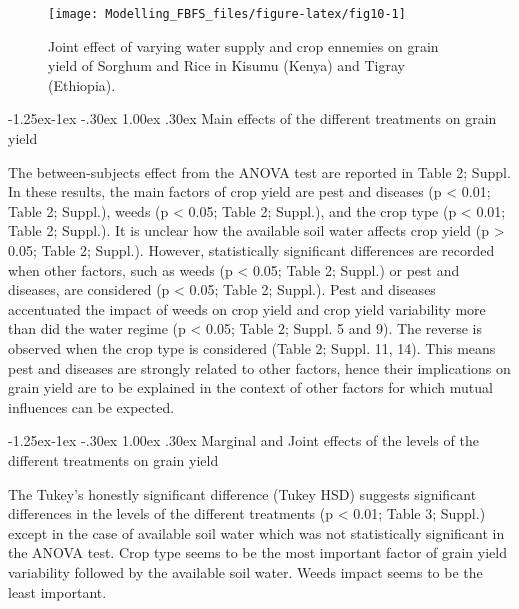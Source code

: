 \documentclass[12pt,oneside]{article}
\makeatletter
\renewcommand\subparagraph{\@startsection{subparagraph}{5}{\z@}%
            {-1.25ex\@plus -1ex \@minus -.30ex}%
            {1.00ex \@plus .30ex}%
            {\normalfont\normalsize\bfseries\itshape}}
\makeatother
\begin{document}
\begin{figure}[!htbp]

{\centering \texttt{[image: Modelling\_FBFS\_files/figure-latex/fig10-1]} 

}

\caption{Joint effect of varying water supply and crop ennemies on grain yield of Sorghum and Rice in Kisumu (Kenya) and Tigray (Ethiopia).}\label{fig:fig10}
\end{figure}

\hypertarget{IV2331}{%
\subparagraph{Main effects of the different treatments on grain yield}\label{IV2331}}

The between-subjects effect from the ANOVA test are reported in Table 2; Suppl. In these results, the main factors of crop yield are pest and diseases (p \textless{} 0.01; Table 2; Suppl.), weeds (p \textless{} 0.05; Table 2; Suppl.), and the crop type (p \textless{} 0.01; Table 2; Suppl.). It is unclear how the available soil water affects crop yield (p \textgreater{} 0.05; Table 2; Suppl.). However, statistically significant differences are recorded when other factors, such as weeds (p \textless{} 0.05; Table 2; Suppl.) or pest and diseases, are considered (p \textless{} 0.05; Table 2; Suppl.). Pest and diseases accentuated the impact of weeds on crop yield and crop yield variability more than did the water regime (p \textless{} 0.05; Table 2; Suppl. 5 and 9). The reverse is observed when the crop type is considered (Table 2; Suppl. 11, 14). This means pest and diseases are strongly related to other factors, hence their implications on grain yield are to be explained in the context of other factors for which mutual influences can be expected.

\hypertarget{IV2332}{%
\subparagraph{Marginal and Joint effects of the levels of the different treatments on grain yield}\label{IV2332}}

The Tukey's honestly significant difference (Tukey HSD) suggests significant differences in the levels of the different treatments (p \textless{} 0.01; Table 3; Suppl.) except in the case of available soil water which was not statistically significant in the ANOVA test. Crop type seems to be the most important factor of grain yield variability followed by the available soil water. Weeds impact seems to be the least important.
\end{document}
